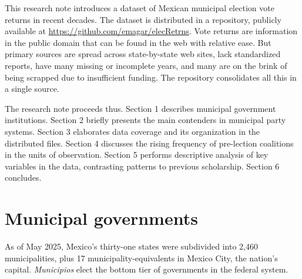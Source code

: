 \documentclass[letter,12pt]{article}
\begin{document}

This research note introduces a dataset of Mexican municipal election vote returns in recent decades. The dataset is distributed in a repository, publicly available at \url{https://github.com/emagar/elecRetrns}. Vote returns are information in the public domain that can be found in the web with relative ease. But primary sources are spread across state-by-state web sites, lack standardized reports, have many missing or incomplete years, and many are on the brink of being scrapped due to insufficient funding. The repository consolidates all this in a single source. 

The research note proceeds thus. Section 1 describes municipal government institutions. Section 2 briefly presents the main contenders in municipal party systems. Section 3 elaborates data coverage and its organization in the distributed files. Section 4 discusses the rising frequency of pre-lection coalitions in the units of observation. Section 5 performs descriptive analysis of key variables in the data, contrasting patterns to previous scholarship. Section 6 concludes.

\section{Municipal governments}
As of May 2025, Mexico's thirty-one states were subdivided into 2,460 municipalities, plus 17 municipality-equivalents in Mexico City, the nation's capital. \emph{Municipios} elect the bottom tier of governments in the federal system.
\end{document}
